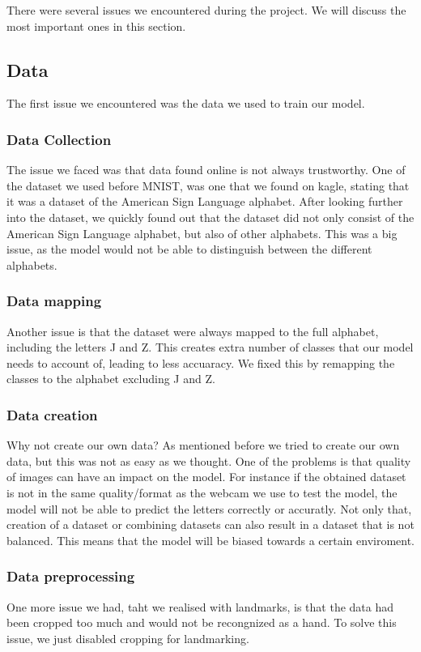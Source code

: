 \documentclass[../paper.tex]{subfiles}
\begin{document}
There were several issues we encountered during the project. 
We will discuss the most important ones in this section.
\subsection{Data}
The first issue we encountered was the data we used to train our model.
\subsubsection{Data Collection}
The issue we faced was that data found online is not always trustworthy.
One of the dataset we used before MNIST, was one that we found on kagle, stating that it was a dataset of the American Sign Language alphabet.
After looking further into the dataset, we quickly found out that the dataset did not only consist of the American Sign Language alphabet, but also of other alphabets.
This was a big issue, as the model would not be able to distinguish between the different alphabets.
\subsubsection{Data mapping}
Another issue is that the dataset were always mapped to the full alphabet, including the letters J and Z.
This creates extra number of classes that our model needs to account of, leading to less accuaracy.
We fixed this by remapping the classes to the alphabet excluding J and Z.
\subsubsection{Data creation}
Why not create our own data? As mentioned before we tried to create our own data, but this was not as easy as we thought.
One of the problems is that quality of images can have an impact on the model. 
For instance if the obtained dataset is not in the same quality/format as the webcam we use to test the model, the model will not be able to predict the letters correctly or accuratly.
Not only that, creation of a dataset or combining datasets can also result in a dataset that is not balanced.
This means that the model will be biased towards a certain enviroment.
\subsubsection{Data preprocessing}
One more issue we had, taht we realised with landmarks, 
is that the data had been cropped too much and would not be recongnized as a hand.
To solve this issue, we just disabled cropping for landmarking.
\end{document}

